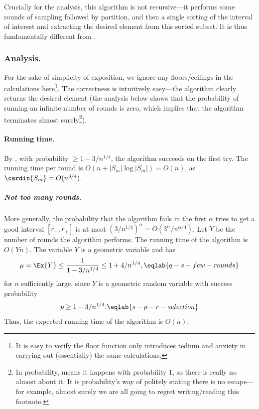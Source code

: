 \begin{remark}
    Crucially for the analysis, this algorithm is not recursive---it
    performs some rounds of sampling followed by partition, and then a
    single sorting of the interval of interest and extracting the desired
    element from this sorted subset. It is thus fundamentally different
    from .
\end{remark}

\subsubsection{Analysis.}

For the sake of simplicity of exposition, we ignore any floors/ceilings
in the calculations here\footnote{It is easy to verify the floor function
   only introduces tedium and anxiety in carrying out (essentially) the
   same calculations.}.  The correctness is intuitively easy---the
algorithm clearly returns the desired element (the analysis below shows
that the probability of running an infinite number of rounds is zero,
which implies that the algorithm terminates almost surely\footnote{In
   probability,  means it happens with probability
   $1$, so there is really no almost about it. It is probability's way of
   politely stating there is no escape---for example, almost surely we are
   all going to regret writing/reading this footnote.}).


\paragraph*{Running time.}
By , with probability $\geq 1-3/n^{1 /4}$, the
algorithm succeeds on the first try.  The running time per round is
$O(n + |S_m| \log |S_m|) = O(n)$, as $\cardin{S_m} = O(n^{3/4})$.




\subparagraph*{Not too many rounds.}

More generally, the probability that the algorithm fails in the first
$\alpha$ tries to get a good interval $[r_{-}, r_{+}]$ is at most
$(3/n^{1/4})^\alpha = O(3^\alpha /n^{\alpha /4})$. Let $Y$ be the number
of rounds the algorithm performs. The running time of the algorithm is
$ O(Yn)$.  The variable $Y$ is a geometric variable and has
\begin{equation}
    \mu = \Ex{Y} \leq  \frac{1}{  1- 3/n^{1/4}} \leq 1 + 4/n^{1/4},
    \eqlab{q-s-few-rounds}
\end{equation}
for $n$ sufficiently large, since $Y$ is a geometric random variable with
success probability
\begin{equation}
    p \geq 1 - 3/n^{1/4}.
    \eqlab{s-p-r-selection}
\end{equation}
Thus, the expected running time of the algorithm is $O(n)$.

